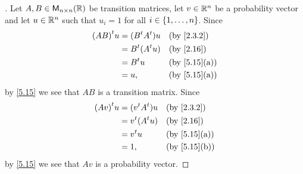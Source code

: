 \begin{proof}[]
  Let \(A, B \in \mathsf{M}_{{n} \times n}({\mathbb{R}})\) be transition matrices, let \(v \in \mathbb{R}^n\) be a probability vector and let \(u \in \mathbb{R}^n\) such that \(u_i = 1\) for all \(i \in \left\lbrace1, \dots, n\right\rbrace\).
  Since
  \begin{align*}
    \tp{(AB)} u & = (\tp{B} \tp{A}) u &  & \text{(by \cref{2.3.2})}   \\
                & = \tp{B} (\tp{A} u) &  & \text{(by \cref{2.16})}    \\
                & = \tp{B} u          &  & \text{(by \cref{5.15}(a))} \\
                & = u,                &  & \text{(by \cref{5.15}(a))}
  \end{align*}
  by \cref{5.15} we see that \(AB\) is a transition matrix.
  Since
  \begin{align*}
    \tp{(Av)} u & = (\tp{v} \tp{A}) u &  & \text{(by \cref{2.3.2})}   \\
                & = \tp{v} (\tp{A} u) &  & \text{(by \cref{2.16})}    \\
                & = \tp{v} u          &  & \text{(by \cref{5.15}(a))} \\
                & = 1,                &  & \text{(by \cref{5.15}(b))}
  \end{align*}
  by \cref{5.15} we see that \(Av\) is a probability vector.
\end{proof}

